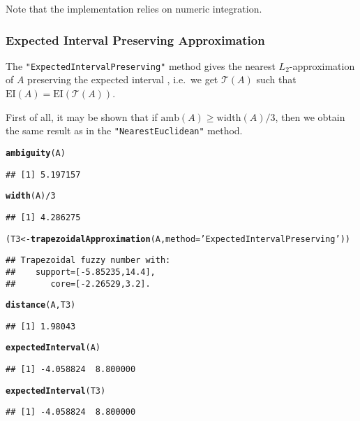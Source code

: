 \documentclass[11pt]{article}\usepackage[]{graphicx}\usepackage[]{color}
\makeatletter
\newcommand{\hlnum}[1]{\textcolor[rgb]{0.686,0.059,0.569}{#1}}%
\newcommand{\hlstr}[1]{\textcolor[rgb]{0.192,0.494,0.8}{#1}}%
\newcommand{\hlopt}[1]{\textcolor[rgb]{0,0,0}{#1}}%
\newcommand{\hlstd}[1]{\textcolor[rgb]{0.345,0.345,0.345}{#1}}%
\newcommand{\hlkwb}[1]{\textcolor[rgb]{0.69,0.353,0.396}{#1}}%
\newcommand{\hlkwc}[1]{\textcolor[rgb]{0.333,0.667,0.333}{#1}}%
\newcommand{\hlkwd}[1]{\textcolor[rgb]{0.737,0.353,0.396}{\textbf{#1}}}%
\newenvironment{kframe}{%
 \def\at@end@of@kframe{}%
 \ifinner\ifhmode%
  \def\at@end@of@kframe{\end{minipage}}%
  \begin{minipage}{\columnwidth}%
 \fi\fi%
 \def\FrameCommand##1{\hskip\@totalleftmargin \hskip-\fboxsep
 \colorbox{shadecolor}{##1}\hskip-\fboxsep
     \hskip-\linewidth \hskip-\@totalleftmargin \hskip\columnwidth}%
 \MakeFramed {\advance\hsize-\width
   \@totalleftmargin\z@ \linewidth\hsize
   \@setminipage}}%
 {\par\unskip\endMakeFramed%
 \at@end@of@kframe}
\newenvironment{knitrout}{}{} %
\newcommand{\str}[1]{\texttt{\hlstr{#1}}}
\makeatother
\begin{document}
Note that the implementation relies on numeric integration.

\subsubsection{Expected Interval Preserving Approximation}


The \str{"{}ExpectedIntervalPreserving"{}} method
gives the nearest $L_2$-approximation of $A$
preserving the expected interval \cite{Ban2008:approxpresexpint,Grzegorzewski2010:trapfnapproxexpint,Yeh2008:traptriapprox},
i.e.~we get $\mathcal{T}(A)$ such that $\mathrm{EI}(A)=\mathrm{EI}(\mathcal{T}(A))$.

First of all, it may be shown that if $\mathrm{amb}(A) \ge \mathrm{width}(A)/3$, then
we obtain the same result as in
the \str{"{}NearestEuclidean"{}} method.


\begin{knitrout}\small
{}\color{fgcolor}\begin{kframe}
\begin{alltt}
\hlkwd{ambiguity}\hlstd{(A)}
\end{alltt}
\begin{verbatim}
## [1] 5.197157
\end{verbatim}
\begin{alltt}
\hlkwd{width}\hlstd{(A)}\hlopt{/}\hlnum{3}
\end{alltt}
\begin{verbatim}
## [1] 4.286275
\end{verbatim}
\begin{alltt}
\hlstd{(T3} \hlkwb{<-} \hlkwd{trapezoidalApproximation}\hlstd{(A,} \hlkwc{method}\hlstd{=}\hlstr{'ExpectedIntervalPreserving'}\hlstd{))}
\end{alltt}
\begin{verbatim}
## Trapezoidal fuzzy number with:
##    support=[-5.85235,14.4],
##       core=[-2.26529,3.2].
\end{verbatim}
\begin{alltt}
\hlkwd{distance}\hlstd{(A, T3)}
\end{alltt}
\begin{verbatim}
## [1] 1.98043
\end{verbatim}
\begin{alltt}
\hlkwd{expectedInterval}\hlstd{(A)}
\end{alltt}
\begin{verbatim}
## [1] -4.058824  8.800000
\end{verbatim}
\begin{alltt}
\hlkwd{expectedInterval}\hlstd{(T3)}
\end{alltt}
\begin{verbatim}
## [1] -4.058824  8.800000
\end{verbatim}
\end{kframe}
\end{knitrout}
\end{document}
